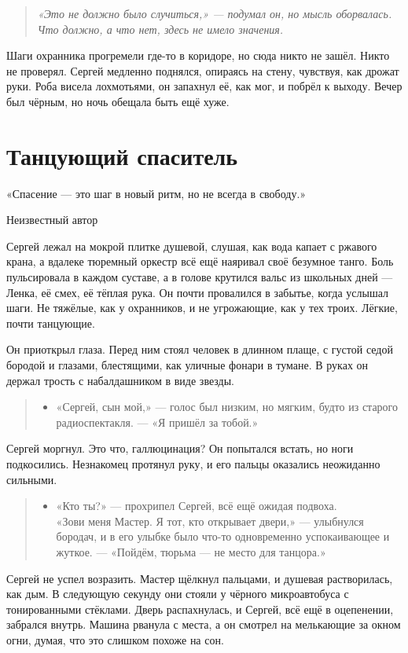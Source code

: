 \documentclass[12pt,a4paper]{book}
\newenvironment{dialogue}{\begin{quote}\itshape\begin{itemize}\item[]}{\end{itemize}\end{quote}}
\newenvironment{innerthought}{\begin{quote}\small\itshape}{\end{quote}}
\begin{document}
\begin{innerthought}
«Это не должно было случиться,» --- подумал он, но мысль оборвалась. Что должно, а что нет, здесь не имело значения.
\end{innerthought}

Шаги охранника прогремели где-то в коридоре, но сюда никто не зашёл. Никто не проверял. Сергей медленно поднялся, опираясь на стену, чувствуя, как дрожат руки. Роба висела лохмотьями, он запахнул её, как мог, и побрёл к выходу. Вечер был чёрным, но ночь обещала быть ещё хуже.

\chapter{Танцующий спаситель}
\epigraph{«Спасение — это шаг в новый ритм, но не всегда в свободу.»}{Неизвестный автор}

Сергей лежал на мокрой плитке душевой, слушая, как вода капает с ржавого крана, а вдалеке тюремный оркестр всё ещё наяривал своё безумное танго. Боль пульсировала в каждом суставе, а в голове крутился вальс из школьных дней --- Ленка, её смех, её тёплая рука. Он почти провалился в забытье, когда услышал шаги. Не тяжёлые, как у охранников, и не угрожающие, как у тех троих. Лёгкие, почти танцующие.

Он приоткрыл глаза. Перед ним стоял человек в длинном плаще, с густой седой бородой и глазами, блестящими, как уличные фонари в тумане. В руках он держал трость с набалдашником в виде звезды.

\begin{dialogue}
«Сергей, сын мой,» --- голос был низким, но мягким, будто из старого радиоспектакля. --- «Я пришёл за тобой.»
\end{dialogue}

Сергей моргнул. Это что, галлюцинация? Он попытался встать, но ноги подкосились. Незнакомец протянул руку, и его пальцы оказались неожиданно сильными.

\begin{dialogue}
«Кто ты?» --- прохрипел Сергей, всё ещё ожидая подвоха. \\
«Зови меня Мастер. Я тот, кто открывает двери,» --- улыбнулся бородач, и в его улыбке было что-то одновременно успокаивающее и жуткое. --- «Пойдём, тюрьма --- не место для танцора.»
\end{dialogue}

Сергей не успел возразить. Мастер щёлкнул пальцами, и душевая растворилась, как дым. В следующую секунду они стояли у чёрного микроавтобуса с тонированными стёклами. Дверь распахнулась, и Сергей, всё ещё в оцепенении, забрался внутрь. Машина рванула с места, а он смотрел на мелькающие за окном огни, думая, что это слишком похоже на сон.
\end{document}
